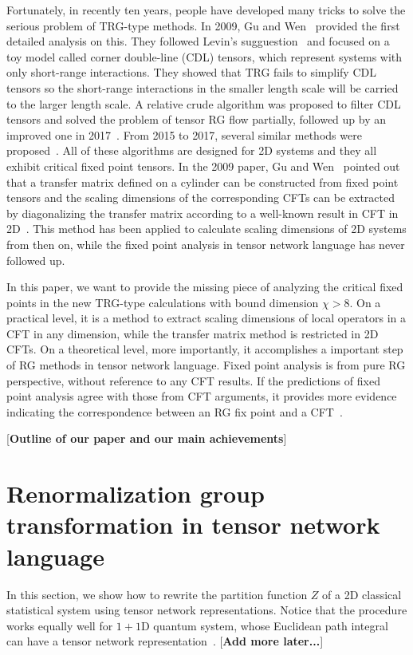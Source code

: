\documentclass[aps,prb,reprint,superscriptaddress]{revtex4-2}
\begin{document}
Fortunately, in recently ten years, people have developed many tricks to
solve the serious problem of TRG-type methods. In 2009, Gu and
Wen~\cite{GuWen2009} provided the first detailed analysis on this. They
followed Levin's sugguestion~\cite{trg,LevinTalk} and focused on a toy
model called corner double-line (CDL) tensors, which represent systems
with only short-range interactions. They showed that TRG fails to
simplify CDL tensors so the short-range interactions in the smaller
length scale will be carried to the larger length scale. A relative
crude algorithm was proposed to filter CDL tensors and solved the
problem of tensor RG flow partially, followed up by an improved one in
2017~\cite{looptnr}. From 2015 to 2017, several similar methods were
proposed~\cite{tnr,tnralgo,tnrplus}. All of these algorithms are
designed for 2D systems and they all exhibit critical fixed point
tensors. In the 2009 paper, Gu and Wen~\cite{GuWen2009} pointed out that
a transfer matrix defined on a cylinder can be constructed from fixed
point tensors and the scaling dimensions of the corresponding CFTs can
be extracted by diagonalizing the transfer matrix according to a
well-known result in CFT in 2D~\cite{cardy1986}.  This method has been
applied to calculate scaling dimensions of 2D systems from then on,
while the fixed point analysis in tensor network language has never
followed up.
%

In this paper, we want to provide the missing piece of analyzing the
critical fixed points in the new TRG-type calculations with bound
dimension $\chi > 8$. On a practical level, it is a method to extract
scaling dimensions of local operators in a CFT in any dimension, while
the transfer matrix method is restricted in 2D CFTs. On a theoretical
level, more importantly, it accomplishes a important step of RG methods
in tensor network language.  Fixed point analysis is from pure RG
perspective, without reference to any CFT results. If the predictions of
fixed point analysis agree with those from CFT arguments, it provides
more evidence indicating the correspondence between an RG fix point and
a CFT~\cite{poland2019}.
%

[\textbf{Outline of our paper and our main achievements}]


\section{Renormalization group transformation in tensor network
language\label{introTRG}}
In this section, we show how to rewrite the partition function $Z$ of
a 2D classical statistical system using tensor network representations.
Notice that the procedure works equally well for $1 + 1$D quantum
system, whose Euclidean path integral can have a tensor network
representation~\cite{GuWen2009}. [\textbf{Add more later...}]
%
\end{document}
